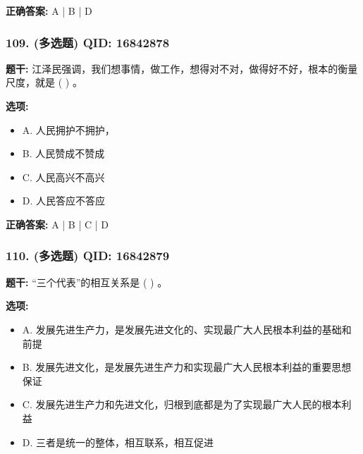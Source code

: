 \documentclass[12pt,UTF8]{ctexart}
\begin{document}
\textbf{正确答案:}
A | B | D

\vspace{0.3em}\hrulefill\vspace{0.7em}

\subsubsection*{109. (多选题) \small QID: 16842878}

\textbf{题干:}
江泽民强调，我们想事情，做工作，想得对不对，做得好不好，根本的衡量尺度，就是 ( ) 。

\textbf{选项:}
\begin{itemize}[leftmargin=*]

  \item A. 人民拥护不拥护，

  \item B. 人民赞成不赞成

  \item C. 人民高兴不高兴

  \item D. 人民答应不答应

\end{itemize}

\textbf{正确答案:}
A | B | C | D

\vspace{0.3em}\hrulefill\vspace{0.7em}

\subsubsection*{110. (多选题) \small QID: 16842879}

\textbf{题干:}
“三个代表”的相互关系是 ( ) 。

\textbf{选项:}
\begin{itemize}[leftmargin=*]

  \item A. 发展先进生产力，是发展先进文化的、实现最广大人民根本利益的基础和前提

  \item B. 发展先进文化，是发展先进生产力和实现最广大人民根本利益的重要思想保证

  \item C. 发展先进生产力和先进文化，归根到底都是为了实现最广大人民的根本利益

  \item D. 三者是统一的整体，相互联系，相互促进

\end{itemize}
\end{document}
